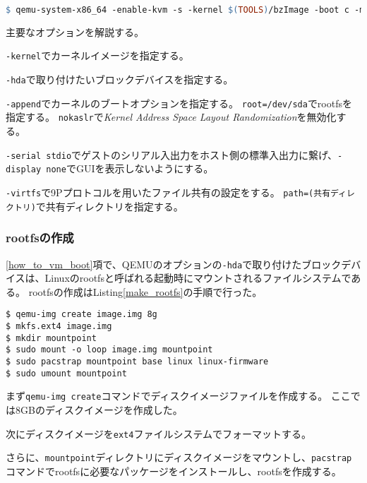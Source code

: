 \documentclass[main]{subfiles}
\begin{document}
\begin{lstlisting}[label=qemu_option,caption=QEMUのオプション,language=make]
$ qemu-system-x86_64 -enable-kvm -s -kernel $(TOOLS)/bzImage -boot c -m 2049M -hda $(TOOLS)/image.img -append "root=/dev/sda rw console=ttyS0,115200 acpi=off nokaslr" -serial stdio -display none -virtfs local,path=$(SHARE),security_model=none,mount_tag=share --no-reboot
\end{lstlisting}

主要なオプションを解説する。

\texttt{-kernel}でカーネルイメージを指定する。

\texttt{-hda}で取り付けたいブロックデバイスを指定する。

\texttt{-append}でカーネルのブートオプションを指定する。
\texttt{root=/dev/sda}でrootfsを指定する。
\texttt{nokaslr}で\textit{Kernel Address Space Layout Randomization}を無効化する。

\texttt{-serial stdio}でゲストのシリアル入出力をホスト側の標準入出力に繋げ、\texttt{-display none}でGUIを表示しないようにする。

\texttt{-virtfs}で9Pプロトコルを用いたファイル共有の設定をする。
\texttt{path=(共有ディレクトリ)}で共有ディレクトリを指定する。

\subsubsection{rootfsの作成}

\ref{how_to_vm_boot}項で、QEMUのオプションの\texttt{-hda}で取り付けたブロックデバイスは、Linuxのrootfsと呼ばれる起動時にマウントされるファイルシステムである。
rootfsの作成はListing\ref{make_rootfs}の手順で行った。

\begin{lstlisting}[label=make_rootfs,caption=rootfsの作成]
$ qemu-img create image.img 8g
$ mkfs.ext4 image.img
$ mkdir mountpoint
$ sudo mount -o loop image.img mountpoint
$ sudo pacstrap mountpoint base linux linux-firmware
$ sudo umount mountpoint
\end{lstlisting}

まず\texttt{qemu-img create}コマンドでディスクイメージファイルを作成する。
ここでは8GBのディスクイメージを作成した。

次にディスクイメージを\texttt{ext4}ファイルシステムでフォーマットする。

さらに、\texttt{mountpoint}ディレクトリにディスクイメージをマウントし、\texttt{pacstrap}コマンドでrootfsに必要なパッケージをインストールし、rootfsを作成する。
\end{document}
